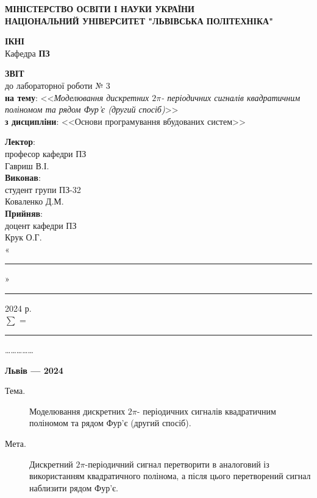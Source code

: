 \documentclass[oneside,14pt]{extarticle}
\newcommand\subject{Основи програмування вбудованих систем}
\newcommand\lecturer{професор кафедри ПЗ\\Гавриш В.І.}
\newcommand\teacher{доцент кафедри ПЗ\\Крук О.Г.}
\newcommand\mygroup{ПЗ-32}
\newcommand\lab{3}
\newcommand\theme{Моделювання дискретних $2\pi$- періодичних сигналів
квадратичним поліномом та рядом Фур’є (другий спосіб)}
\newcommand\purpose{Дискретний $2\pi$-періодичний сигнал перетворити в
аналоговий із використанням квадратичного полінома, а після цього
перетворений сигнал наблизити рядом Фур’є}
\begin{document}
\begin{normalsize}
	\begin{titlepage}
		\thispagestyle{empty}
		\begin{center}
			\textbf{МІНІСТЕРСТВО ОСВІТИ І НАУКИ УКРАЇНИ\\
				НАЦІОНАЛЬНИЙ УНІВЕРСИТЕТ "ЛЬВІВСЬКА ПОЛІТЕХНІКА"}
		\end{center}
		\begin{flushright}
			\textbf{ІКНІ}\\
			Кафедра \textbf{ПЗ}
		\end{flushright}
		\vspace{120pt}
		\begin{center}
			\textbf{ЗВІТ}\\
			\vspace{10pt}
			до лабораторної роботи № \lab\\
			\textbf{на тему}: <<\textit{\theme}>>\\
			\textbf{з дисципліни}: <<\subject>>
		\end{center}
		\vspace{40pt}
		\begin{flushright}
			
			\textbf{Лектор}:\\
			\lecturer\\
			\vspace{28pt}
			\textbf{Виконав}:\\
			
			студент групи \mygroup\\
			Коваленко Д.М.\\
			\vspace{28pt}
			\textbf{Прийняв}:\\
			
			\teacher\\
			
			\vspace{28pt}
			«\rule{1cm}{0.15mm}» \rule{1.5cm}{0.15mm} 2024 р.\\
			$\sum$ = \rule{1cm}{0.15mm}……………\\
			
		\end{flushright}
		\vspace{\fill}
		\begin{center}
			\textbf{Львів — 2024}
		\end{center}
	\end{titlepage}
		
	\begin{description}
		\item[Тема.] \theme.
		\item[Мета.] \purpose.
	\end{description}


\end{normalsize}
\end{document}
